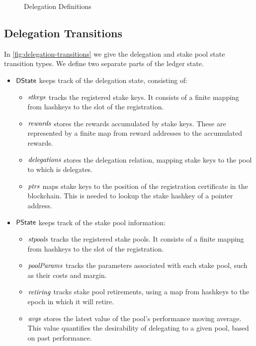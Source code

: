 \begin{figure}[htb]
  \caption{Delegation Definitions}
  \label{fig:delegation-defs}
\end{figure}

\clearpage

\subsection{Delegation Transitions}
\label{sec:deleg-trans}


In \cref{fig:delegation-transitions} we give the delegation and stake pool
state transition types. We define two separate parts of the ledger state.

\begin{itemize}
  \item $\mathsf{DState}$ keeps track of the delegation state, consisting of:
    \begin{itemize}
      \item $\mathit{stkeys}$ tracks the registered stake keys. It consists of a finite
        mapping from hashkeys to the slot of the registration.
      \item $\mathit{rewards}$ stores the rewards accumulated by stake keys.
        These are represented by a finite map from reward addresses to the accumulated rewards.
      \item $\mathit{delegations}$ stores the delegation relation, mapping stake keys to the
        pool to which is delegates.
      \item $\mathit{ptrs}$ maps stake keys to the position of the registration certificate
        in the blockchain. This is needed to lookup the stake hashkey of a pointer address.
    \end{itemize}
  \item $\mathsf{PState}$ keeps track of the stake pool information:
    \begin{itemize}
      \item $\mathit{stpools}$ tracks the registered stake pools. It consists of a finite
        mapping from hashkeys to the slot of the registration.
      \item $\mathit{poolParams}$ tracks the parameters associated with each stake pool, such as
        their costs and margin.
      \item $\mathit{retiring}$ tracks stake pool retirements, using a map from hashkeys to
        the epoch in which it will retire.
      \item $\mathit{avgs}$ stores the latest value of the pool's performance moving average.  This
        value quantifies the desirability of delegating to a given pool, based on past performance.
    \end{itemize}
\end{itemize}

